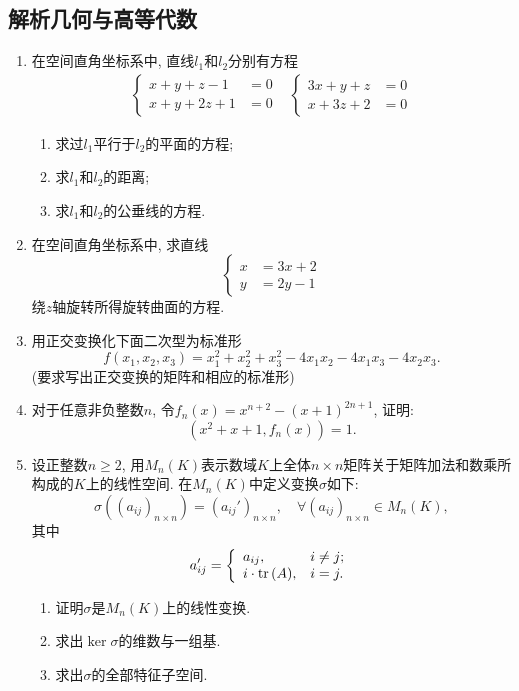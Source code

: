 \documentclass[12pt,a4paper,openany]{book}
\newcommand\tr{\text{tr\,}}
\begin{document}
\subsection{解析几何与高等代数}
\begin{enumerate}
\item 在空间直角坐标系中, 直线$l_1$和$l_2$分别有方程
\[
\begin{array}{cc}
\left\{
\begin{aligned}
x + y + z - 1 &= 0 \\
x + y + 2z + 1 &= 0
\end{aligned}
\right. & 
\left\{
\begin{aligned}
3x + y + z &= 0 \\
x + 3z + 2 &= 0
\end{aligned}
\right.
\end{array}
\]
\begin{enumerate}
\item 求过$l_1$平行于$l_2$的平面的方程;
\item 求$l_1$和$l_2$的距离;
\item 求$l_1$和$l_2$的公垂线的方程.
\end{enumerate}

\item 在空间直角坐标系中, 求直线
\[
\left\{
\begin{aligned}
x &= 3x + 2 \\
y &= 2y - 1
\end{aligned}
\right.
\]
绕$z$轴旋转所得旋转曲面的方程.

\item 用正交变换化下面二次型为标准形
\[
f(x_1, x_2, x_3) = x_1^2 + x_2^2 + x_3^2 - 4x_1x_2 - 4x_1x_3 - 4x_2x_3.
\]
(要求写出正交变换的矩阵和相应的标准形)

\item 对于任意非负整数$n$, 令$f_n(x) = x^{n+2} - (x+1)^{2n+1}$, 证明:
\[
(x^2 + x + 1, f_n(x)) = 1.
\]

\item 设正整数$n \ge 2$, 用$M_n(K)$表示数域$K$上全体$n \times n$矩阵关于矩阵加法和数乘所构成的$K$上的线性空间. 在$M_n(K)$中定义变换$\sigma$如下:
\[
\sigma((a_{ij})_{n \times n}) = (a_{ij}')_{n \times n}, \quad \forall (a_{ij})_{n \times n} \in M_n(K),
\]
其中
\[
a_{ij}' = \left\{
\begin{array}{ll}
a_{ij}, & i \neq j; \\
i \cdot \tr(A), & i = j.
\end{array}
\right.
\]
\begin{enumerate}
\item 证明$\sigma$是$M_n(K)$上的线性变换.
\item 求出$\ker{\sigma}$的维数与一组基.
\item 求出$\sigma$的全部特征子空间.
\end{enumerate}


\end{enumerate}
\end{document}
